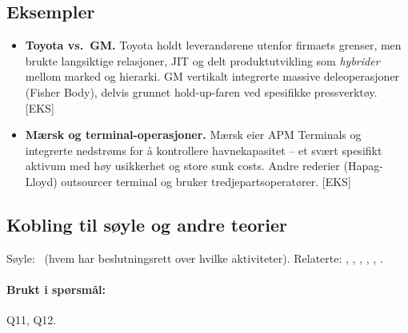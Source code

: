 \subsection*{Eksempler}
\begin{itemize}\setlength{\itemsep}{2pt}
\item \textbf{Toyota vs.\ GM.} Toyota holdt leverandørene utenfor firmaets grenser, men brukte langsiktige relasjoner, JIT og delt produktutvikling som \emph{hybrider} mellom marked og hierarki. GM vertikalt integrerte massive deleoperasjoner (Fisher Body), delvis grunnet hold-up-faren ved spesifikke pressverktøy. [EKS]
\item \textbf{Mærsk og terminal-operasjoner.} Mærsk eier APM Terminals og integrerte nedstrøms for å kontrollere havnekapasitet -- et svært spesifikt aktivum med høy usikkerhet og store sunk costs. Andre rederier (Hapag-Lloyd) outsourcer terminal og bruker tredjepartsoperatører. [EKS]
\end{itemize}

\subsection*{Kobling til søyle og andre teorier}
Søyle: \SOne\ (hvem har beslutningsrett over hvilke aktiviteter). Relaterte: , , , , , .

\paragraph{Brukt i spørsmål:} Q11, Q12.
